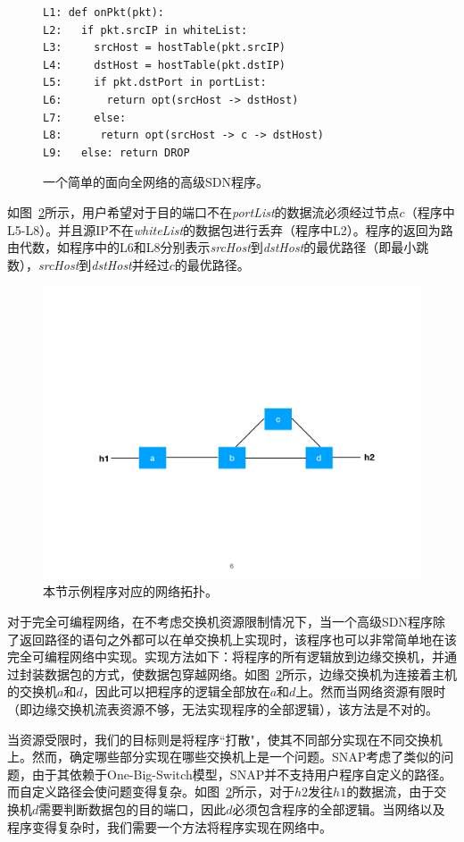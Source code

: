 \begin{figure}[h]
\small{
\begin{verbatim}
L1: def onPkt(pkt):
L2:   if pkt.srcIP in whiteList:
L3:     srcHost = hostTable(pkt.srcIP)
L4:     dstHost = hostTable(pkt.dstIP)
L5:     if pkt.dstPort in portList:
L6:       return opt(srcHost -> dstHost)
L7:     else:
L8:      return opt(srcHost -> c -> dstHost)
L9:   else: return DROP
\end{verbatim}
}
    \caption{\small 一个简单的面向全网络的高级SDN程序。}
\label{fig:code1}
\end{figure}

如图~\ref{fig:topo1}所示，用户希望对于目的端口不在\emph{portList}的数据流必须经过节点$c$（程序中L5-L8）。并且源IP不在\emph{whiteList}的数据包进行丢弃（程序中L2）。程序的返回为路由代数，如程序中的L6和L8分别表示\emph{srcHost}到\emph{dstHost}的最优路径（即最小跳数），\emph{srcHost}到\emph{dstHost}并经过$c$的最优路径。

\begin{figure}[!htbp]
\includegraphics[width=0.8\linewidth]{figures/global-topo.pdf}
\centering
\caption{\small 本节示例程序对应的网络拓扑。}
\label{fig:topo1}
\end{figure}

对于完全可编程网络，在不考虑交换机资源限制情况下，当一个高级SDN程序除了返回路径的语句之外都可以在单交换机上实现时，该程序也可以非常简单地在该完全可编程网络中实现。实现方法如下：将程序的所有逻辑放到边缘交换机，并通过封装数据包的方式，使数据包穿越网络。如图~\ref{fig:topo1}所示，边缘交换机为连接着主机的交换机$a$和$d$，因此可以把程序的逻辑全部放在$a$和$d$上。然而当网络资源有限时（即边缘交换机流表资源不够，无法实现程序的全部逻辑），该方法是不对的。

当资源受限时，我们的目标则是将程序``打散"，使其不同部分实现在不同交换机上。然而，确定哪些部分实现在哪些交换机上是一个问题。SNAP考虑了类似的问题，由于其依赖于One-Big-Switch模型，SNAP并不支持用户程序自定义的路径。而自定义路径会使问题变得复杂。如图~\ref{fig:topo1}所示，对于$h2$发往$h1$的数据流，由于交换机$d$需要判断数据包的目的端口，因此$d$必须包含程序的全部逻辑。当网络以及程序变得复杂时，我们需要一个方法将程序实现在网络中。



